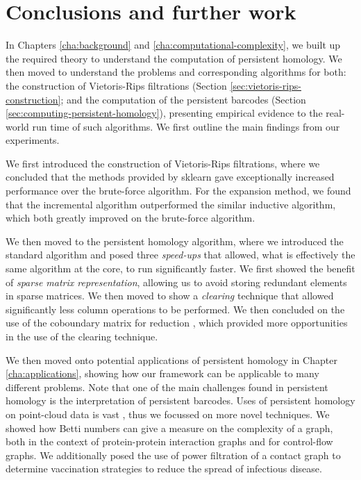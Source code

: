 \chapter{Conclusions and further work}

In Chapters \ref{cha:background} and \ref{cha:computational-complexity}, we built up the required theory to understand the computation of persistent homology. We then moved to understand the problems and corresponding algorithms for both: the construction of Vietoris-Rips filtrations (Section \ref{sec:vietoris-rips-construction}; and the computation of the persistent barcodes (Section \ref{sec:computing-persistent-homology}), presenting empirical evidence to the real-world run time of such algorithms. We first outline the main findings from our experiments.

We first introduced the construction of Vietoris-Rips filtrations, where we concluded that the methods provided by sklearn \cite{scikit-learn} gave exceptionally increased performance over the brute-force algorithm. For the expansion method, we found that the incremental algorithm outperformed the similar inductive algorithm, which both greatly improved on the brute-force algorithm.

We then moved to the persistent homology algorithm, where we introduced the standard algorithm \cite{edelsbrunner2000topological} and posed three \emph{speed-ups} that allowed, what is effectively the same algorithm at the core, to run significantly faster. We first showed the benefit of \emph{sparse matrix representation}, allowing us to avoid storing redundant elements in sparse matrices. We then moved to show a \emph{clearing} technique \cite{chen2011persistent} that allowed significantly less column operations to be performed. We then concluded on the use of the coboundary matrix for reduction \cite{de2011dualities}, which provided more opportunities in the use of the clearing technique. 

We then moved onto potential applications of persistent homology in Chapter \ref{cha:applications}, showing how our framework can be applicable to many different problems. Note that one of the main challenges found in persistent homology is the interpretation of persistent barcodes. Uses of persistent homology on point-cloud data is vast \cite{otter2017roadmap}, thus we focussed on more novel techniques. We showed how Betti numbers can give a measure on the complexity of a graph, both in the context of protein-protein interaction graphs and for control-flow graphs. We additionally posed the use of power filtration of a contact graph to determine vaccination strategies to reduce the spread of infectious disease. 

